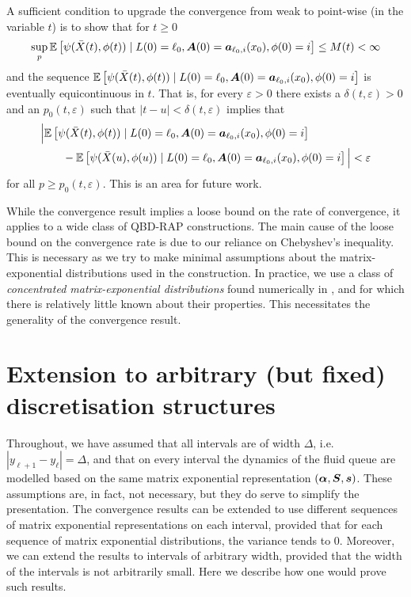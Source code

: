 A sufficient condition to upgrade the convergence from weak to point-wise (in the variable \(t\)) is to show that for \(t\geq 0\) 
\[\sup_{p}\mathbb E\left[\psi(\bar X(t),\phi(t))  \mid L(0)=\ell_0, \boldsymbol A(0)=\boldsymbol  a_{\ell_0,i}(x_0), \phi(0)=i \right]  \leq M(t)<\infty\]
and the sequence \(\mathbb E\left[\psi(\bar X(t),\phi(t))  \mid L(0)=\ell_0, \boldsymbol A(0)=\boldsymbol  a_{\ell_0,i}(x_0), \phi(0)=i \right] \) is eventually equicontinuous in \(t\). That is, for every \(\varepsilon>0\) there exists a \(\delta(t,\varepsilon)>0\) and an \(p_0(t,\varepsilon)\) such that \(|t-u|<\delta(t,\varepsilon)\) implies that 
\begin{align}
	&\nonumber \Big|\mathbb E\left[\psi(\bar X(t),\phi(t))  \mid L(0)=\ell_0, \boldsymbol A(0)=\boldsymbol  a_{\ell_0,i}(x_0), \phi(0)=i \right]
	\\&\qquad{}-\mathbb E\left[\psi(\bar X(u),\phi(u))  \mid L(0)=\ell_0, \boldsymbol A(0)=\boldsymbol  a_{\ell_0,i}(x_0), \phi(0)=i \right]\Big|<\varepsilon
\end{align}
for all \(p\geq p_0(t,\varepsilon)\). This is an area for future work. 

\begin{rem}
	While the convergence result implies a loose bound on the rate of convergence, it applies to a wide class of QBD-RAP constructions. The main cause of the loose bound on the convergence rate is due to our reliance on Chebyshev's inequality. This is necessary as we try to make minimal assumptions about the matrix-exponential distributions used in the construction. In practice, we use a class of \emph{concentrated matrix-exponential distributions} found numerically in \citep{hht2020}, and for which there is relatively little known about their properties. This necessitates the generality of the convergence result. 
\end{rem}

\section{Extension to arbitrary (but fixed) discretisation structures}
Throughout, we have assumed that all intervals are of width \(\Delta\), i.e.~\(|y_{\ell+1}-y_\ell|=\Delta\), and that on every interval the dynamics of the fluid queue are modelled based on the same matrix exponential representation \((\boldsymbol \alpha, \boldsymbol S, \boldsymbol s)\). These assumptions are, in fact, not necessary, but they do serve to simplify the presentation. The convergence results can be extended to use different sequences of matrix exponential representations on each interval, provided that for each sequence of matrix exponential distributions, the variance tends to \(0\). Moreover, we can extend the results to intervals of arbitrary width, provided that the width of the intervals is not arbitrarily small. Here we describe how one would prove such results.

